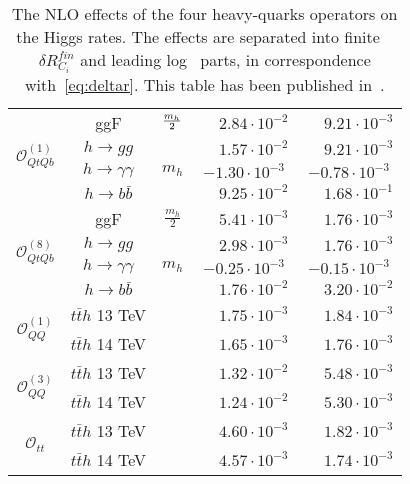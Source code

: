 \begin{table}[t!]
{\begin{tabular}{c||cccc}
                       	                                                   	\midrule
           \multirow{4}{*}{ { \normalsize$\mathcal{O}_{QtQb}^{(1)}$} } & ggF& ${m_h\over 2}$&$\phantom{+}2.84\cdot 10^{-2}$&$\phantom{+}9.21\cdot 10^{-3}$\\   %
            &  $h \to gg$& \multirow{3}{*}{$m_h$}&$\phantom{+}1.57\cdot 10^{-2}$&$\phantom{+}9.21\cdot 10^{-3}$\\
           &  $h \to \gamma \gamma$& &$-1.30\cdot 10^{-3}$&$-0.78\cdot 10^{-3}$\\
           &  $h \to b \bar b$& &$\phantom{+}9.25\cdot 10^{-2}$&$\phantom{+}1.68\cdot 10^{-1}$\\
			\midrule
			 \multirow{4}{*}{{ \normalsize$\mathcal{O}_{QtQb}^{(8)}$}}  & ggF& {$\frac{m_h}{ 2}$}&$\phantom{+}5.41\cdot 10^{-3}$&$\phantom{+}1.76\cdot 10^{-3}$\\      %
			 & $h \to gg$& \multirow{3}{*}{$m_h$}&$\phantom{+}2.98\cdot 10^{-3}$&$\phantom{+}1.76\cdot 10^{-3}$\\
			&  $h \to \gamma \gamma$& &$-0.25\cdot 10^{-3}$& $-0.15\cdot 10^{-3}$\\
			&  $h \to b \bar b$& &$\phantom{+}1.76\cdot 10^{-2}$&$\phantom{+}3.20\cdot 10^{-2}$\\
			\midrule	    	 
			 \multirow{2}{*}{{ \normalsize$\mathcal{O}_{QQ}^{(1)}$}  }
			 	&  $t\bar t h$ {\color{Mahogany}  13 TeV }& \mr{$m_t+\frac{m_h}{ 2}$}&  {$\phantom{+}1.75\cdot 10^{-3}$} &$\phantom{+}1.84\cdot 10^{-3}$\\	    
			 &   $t\bar t h$  {\color{Mahogany}  14 TeV }& & $\phantom{+}1.65\cdot 10^{-3}$& $\phantom{+}1.76\cdot 10^{-3}$\\          
			 \midrule	    	 
			 \multirow{2}{*}{{ \normalsize$\mathcal{O}_{QQ}^{(3)}$}  }
			 &  $t\bar t h$ {\color{Mahogany}  13 TeV }& \mr{$m_t+\frac{m_h}{ 2}$}&  $\phantom{+}1.32\cdot 10^{-2}$ & $\phantom{+}5.48\cdot 10^{-3}$\\	    
			 &   $t\bar t h$  {\color{Mahogany}  14 TeV }& & $\phantom{+}1.24\cdot 10^{-2}$& $\phantom{+}5.30\cdot 10^{-3}$\\        
			  \midrule	    	 
			 \multirow{2}{*}{{ \normalsize$\mathcal{O}_{tt}$}  }
			 &  $t\bar t h$ {\color{Mahogany}  13 TeV }& \mr{$m_t+\frac{m_h}{ 2}$}&  $\phantom{+}4.60\cdot 10^{-3}$ &$\phantom{+}1.82\cdot 10^{-3}$\\	    
			 &   $t\bar t h$  {\color{Mahogany}  14 TeV }& & $\phantom{+}4.57\cdot 10^{-3}$& $\phantom{+}1.74\cdot 10^{-3}$\\                                           	
			\bottomrule
		\end{tabular}
	}
\caption{The NLO effects of the four heavy-quarks operators on the Higgs rates. The effects are separated into finite ~$ \delta R_{C_i}^{fin}$ and leading log~ parts, in correspondence with~\eqref{eq:deltar}.  This table has been published in~\cite{Alasfar:2022zyr}.}
\label{table:res4top}
\end{table}

